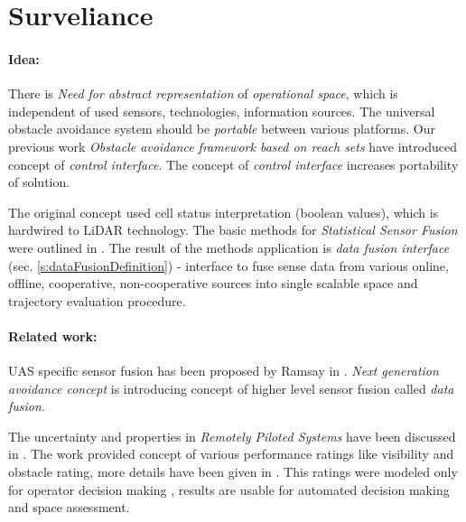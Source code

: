 \section{Surveliance}\label{s:dataFusionProbabilisticModelTheory}
\paragraph{Idea:}  There is \emph{Need for abstract representation} of \emph{operational space}, which is independent of used sensors, technologies, information sources. The universal obstacle avoidance system should be \emph{portable} between various platforms. Our previous work \emph{Obstacle avoidance framework based on reach sets} \cite{gomola2017obstacle} have introduced concept of \emph{control interface}. The concept of \emph{control interface} increases portability of solution.

The original concept used cell status interpretation (boolean values), which is hardwired to LiDAR technology. The basic methods for \emph{Statistical Sensor Fusion} were outlined in \cite{gustafsson2010statistical}. The result of the methods application is \emph{data fusion interface} (sec. \ref{s:dataFusionDefinition}) - interface to fuse sense data from various online, offline, cooperative, non-cooperative sources into single scalable {space and trajectory evaluation procedure}.
    
\paragraph{Related work:} \noindent UAS specific sensor fusion has been proposed by Ramsay in \cite{ramasamy2014avionics}. \emph{Next generation avoidance concept} \cite{ramasamy2014next} is introducing concept of higher level sensor fusion called \emph{data fusion}. 

The uncertainty and properties in \emph{Remotely Piloted Systems} have been discussed in \cite{chynchenko2016remotely}. The work provided concept of various performance ratings like visibility and obstacle rating, more details have been given in \cite{shmelova2016modeling}. This ratings were modeled only for operator decision making \cite{kharchenko2017modelling}, results are usable for automated decision making and space assessment. 




